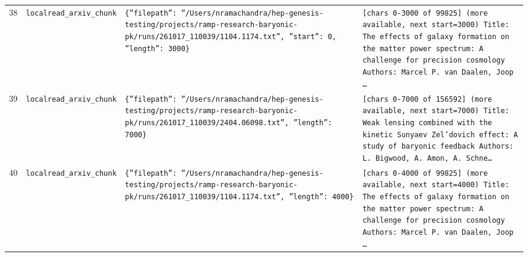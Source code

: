 \documentclass[11pt,a4paper]{article}
\begin{document}
\begin{longtable}{@{}p{}p{}p{}p{}@{}}
38 & \texttt{local}\newline\texttt{read\_\allowbreak{}arxiv\_\allowbreak{}chunk} & \texttt{\{''filepath'':\allowbreak{} ''/\allowbreak{}Users/\allowbreak{}nramachandra/\allowbreak{}hep-genesis-testing/\allowbreak{}projects/\allowbreak{}ramp-research-baryonic-pk/\allowbreak{}runs/\allowbreak{}261017\_\allowbreak{}110039/\allowbreak{}1104.1174.txt'',\allowbreak{} ''start'':\allowbreak{} 0,\allowbreak{} ''length'':\allowbreak{} 3000\}\allowbreak{}} & \texttt{[chars 0-3000 of 99825]\allowbreak{} (more available,\allowbreak{} next start=\allowbreak{}3000)\allowbreak{}  Title:\allowbreak{} The effects of galaxy formation on the matter power spectrum:\allowbreak{} A challenge for precision cosmology Authors:\allowbreak{} Marcel P. van Daalen,\allowbreak{} Joop \ldots{}\allowbreak{}} \\
39 & \texttt{local}\newline\texttt{read\_\allowbreak{}arxiv\_\allowbreak{}chunk} & \texttt{\{''filepath'':\allowbreak{} ''/\allowbreak{}Users/\allowbreak{}nramachandra/\allowbreak{}hep-genesis-testing/\allowbreak{}projects/\allowbreak{}ramp-research-baryonic-pk/\allowbreak{}runs/\allowbreak{}261017\_\allowbreak{}110039/\allowbreak{}2404.06098.txt'',\allowbreak{} ''length'':\allowbreak{} 7000\}\allowbreak{}} & \texttt{[chars 0-7000 of 156592]\allowbreak{} (more available,\allowbreak{} next start=\allowbreak{}7000)\allowbreak{}  Title:\allowbreak{} Weak lensing combined with the kinetic Sunyaev Zel'dovich effect:\allowbreak{} A study of baryonic feedback Authors:\allowbreak{} L. Bigwood,\allowbreak{} A. Amon,\allowbreak{} A. Schne\ldots{}\allowbreak{}} \\
40 & \texttt{local}\newline\texttt{read\_\allowbreak{}arxiv\_\allowbreak{}chunk} & \texttt{\{''filepath'':\allowbreak{} ''/\allowbreak{}Users/\allowbreak{}nramachandra/\allowbreak{}hep-genesis-testing/\allowbreak{}projects/\allowbreak{}ramp-research-baryonic-pk/\allowbreak{}runs/\allowbreak{}261017\_\allowbreak{}110039/\allowbreak{}1104.1174.txt'',\allowbreak{} ''length'':\allowbreak{} 4000\}\allowbreak{}} & \texttt{[chars 0-4000 of 99825]\allowbreak{} (more available,\allowbreak{} next start=\allowbreak{}4000)\allowbreak{}  Title:\allowbreak{} The effects of galaxy formation on the matter power spectrum:\allowbreak{} A challenge for precision cosmology Authors:\allowbreak{} Marcel P. van Daalen,\allowbreak{} Joop \ldots{}\allowbreak{}} \\

\end{longtable}
\end{document}
